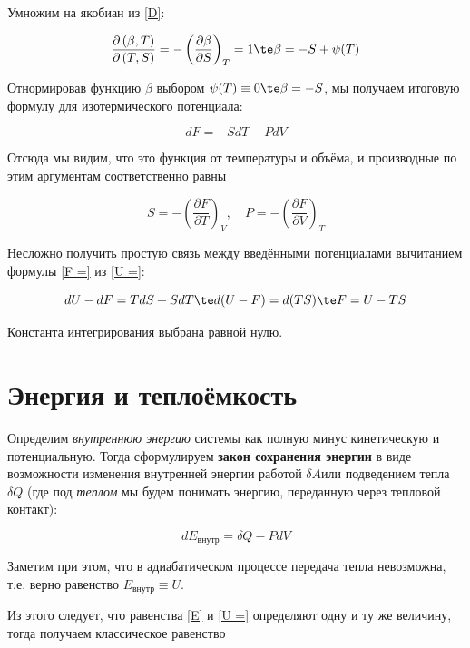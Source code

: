 \documentclass[12pt]{kiarticle}
\newcommand{\del}{\ensuremath{\delta}}
\newcommand{\spdd}[2]{\left( \frac{\partial #1}{\partial #2} \right)}
\newcommand{\Dd}[4]{\frac{\partial \left( #1, #2\right) }{\partial \left( #3, #4\right)}}
\begin{document}
Умножим на якобиан из \eqref{D}:

\begin{equation}\label{}
\Dd{\beta}{T}{T}{S} = -\spdd{\beta}{S}_T = 1 \te \beta = -S + \psi(T)
\end{equation}

Отнормировав функцию $ \beta $ выбором $ \psi(T) \equiv 0 \te \beta=-S $, мы получаем итоговую формулу для изотермического потенциала:

\begin{equation}\label{F =}
dF = - SdT - PdV
\end{equation}

Отсюда мы видим, что это функция от температуры и объёма, и производные по этим аргументам соответственно равны 

\begin{equation}\label{}
S = -\spdd{F}{T}_V, \quad P = - \spdd{F}{V}_T
\end{equation}

Несложно получить простую связь между введёнными потенциалами вычитанием формулы \eqref{F =} из \eqref{U =}:

\begin{equation}\label{}
dU - dF = TdS + SdT \te d(U - F) = d(TS) \te F = U - TS
\end{equation}

Константа интегрирования выбрана равной нулю. 



\section{Энергия и теплоёмкость}

Определим \textit{внутреннюю энергию} системы как полную минус кинетическую и потенциальную. Тогда сформулируем \textbf{закон сохранения энергии} в виде возможности изменения внутренней энергии работой $ \del A $или подведением тепла $ \del Q $  (где под \textit{теплом} мы будем понимать энергию, переданную через тепловой контакт):

\begin{equation}\label{E}
dE_{\text{внутр}} = \del Q - PdV
\end{equation}

Заметим при этом, что в адиабатическом процессе передача тепла невозможна, т.е. верно равенство $ E_{\text{внутр}} \equiv U $.

Из этого следует, что равенства \eqref{E} и \eqref{U =} определяют одну и ту же величину, тогда получаем классическое равенство 
\end{document}
